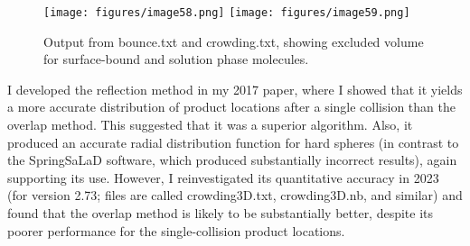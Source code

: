\documentclass {scrbook}
\begin{document}
\begin{figure}[h]
\centering
\texttt{[image: figures/image58.png]}
\texttt{[image: figures/image59.png]}
\caption{Output from bounce.txt and crowding.txt, showing excluded volume for surface-bound and solution phase molecules.}
\label{fig:crowding}
\end{figure}

I developed the reflection method in my 2017 paper, where I showed that it yields a more accurate distribution of product locations after a single collision than the overlap method. This suggested that it was a superior algorithm. Also, it produced an accurate radial distribution function for hard spheres (in contrast to the SpringSaLaD software, which produced substantially incorrect results), again supporting its use. However, I reinvestigated its quantitative accuracy in 2023 (for version 2.73; files are called crowding3D.txt, crowding3D.nb, and similar) and found that the overlap method is likely to be substantially better, despite its poorer performance for the single-collision product locations.
\end{document}
